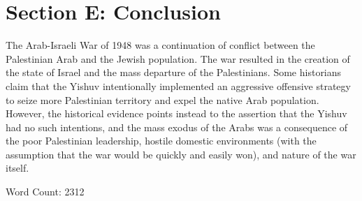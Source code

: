 \documentclass[12pt]{turabian-researchpaper}
\begin{document}

\section{Section E: Conclusion}
The Arab-Israeli War of 1948 was a continuation of conflict between the Palestinian Arab and the Jewish population.  The war resulted in the creation of the state of Israel and the mass departure of the Palestinians.  Some historians claim that the Yishuv intentionally implemented an aggressive offensive strategy to seize more Palestinian territory and expel the native Arab population.  However, the historical evidence points instead to the assertion that the Yishuv had no such intentions, and the mass exodus of the Arabs was a consequence of the poor Palestinian leadership, hostile domestic environments (with the assumption that the war would be quickly and easily won), and nature of the war itself.

Word Count: 2312

\printbibliography[title=Section F: Bibliography]{}
\end{document}
